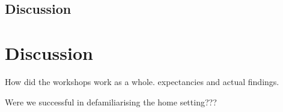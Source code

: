 \subsection{Discussion}
\label{ch:workshops:workshop-ii:discussion}

\section{Discussion}
\label{ch:workshops:discussion}

How did the workshops work as a whole. expectancies and actual findings.

 Were we successful in defamiliarising the home setting???


